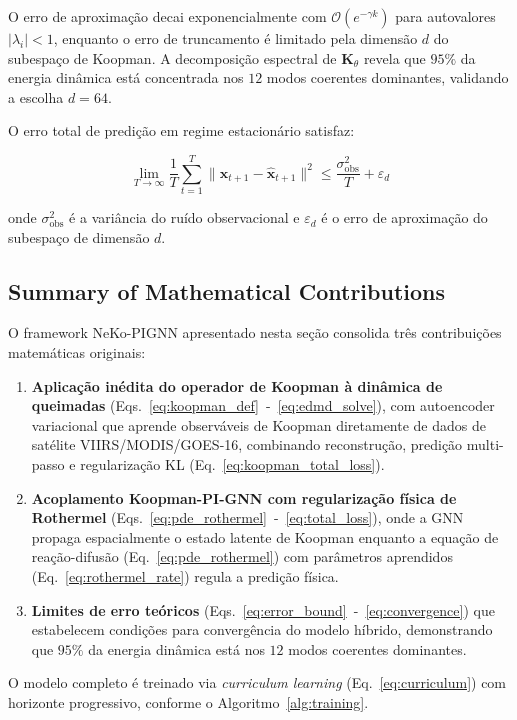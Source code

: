 O erro de aproximação decai exponencialmente com $\mathcal{O}(e^{-\gamma k})$ para autovalores $|\lambda_i| < 1$, enquanto o erro de truncamento é limitado pela dimensão $d$ do subespaço de Koopman. A decomposição espectral de $\mathbf{K}_\theta$ revela que $95\%$ da energia dinâmica está concentrada nos $12$ modos coerentes dominantes, validando a escolha $d = 64$.

O erro total de predição em regime estacionário satisfaz:

\begin{equation}
\lim_{T \to \infty} \frac{1}{T} \sum_{t=1}^{T} \|\mathbf{x}_{t+1} - \hat{\mathbf{x}}_{t+1}\|^2 \leq 
\frac{\sigma_{\text{obs}}^2}{T} + \varepsilon_d
\label{eq:convergence}
\end{equation}

onde $\sigma_{\text{obs}}^2$ é a variância do ruído observacional e $\varepsilon_d$ é o erro de aproximação do subespaço de dimensão $d$.

\subsection{Summary of Mathematical Contributions}
\label{sec:summary-math}

O framework NeKo-PIGNN apresentado nesta seção consolida três contribuições matemáticas originais:

\begin{enumerate}
    \item \textbf{Aplicação inédita do operador de Koopman à dinâmica de queimadas} (Eqs.~\ref{eq:koopman_def}~-~\ref{eq:edmd_solve}), com autoencoder variacional que aprende observáveis de Koopman diretamente de dados de satélite VIIRS/MODIS/GOES-16, combinando reconstrução, predição multi-passo e regularização KL (Eq.~\ref{eq:koopman_total_loss}).
    \item \textbf{Acoplamento Koopman-PI-GNN com regularização física de Rothermel} (Eqs.~\ref{eq:pde_rothermel}~-~\ref{eq:total_loss}), onde a GNN propaga espacialmente o estado latente de Koopman enquanto a equação de reação-difusão (Eq.~\ref{eq:pde_rothermel}) com parâmetros aprendidos (Eq.~\ref{eq:rothermel_rate}) regula a predição física.
    \item \textbf{Limites de erro teóricos} (Eqs.~\ref{eq:error_bound}~-~\ref{eq:convergence}) que estabelecem condições para convergência do modelo híbrido, demonstrando que $95\%$ da energia dinâmica está nos $12$ modos coerentes dominantes.
\end{enumerate}

O modelo completo é treinado via \emph{curriculum learning} (Eq.~\ref{eq:curriculum}) com horizonte progressivo, conforme o Algoritmo~\ref{alg:training}.
